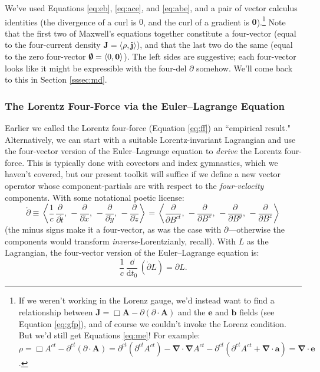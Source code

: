\documentclass[12pt]{article}
\renewcommand{\vv}[1]{\mathbf{#1}}
\newcommand{\dd}[1]{\mathrm{d}#1}
\newcommand{\del}{\boldsymbol{\nabla}}
\begin{document}
We've used Equations \ref{eq:eb}, \ref{eq:ace}, and \ref{eq:abe}, and a pair of vector calculus identities (the divergence of a curl is $0$, and the curl of a gradient is $\vv 0$).\footnote{If we weren't working in the Lorenz gauge, we'd instead want to find a relationship between $\vv J = \Box \vv A - \partialup (\partialup \cdot \vv A)$ and the $\vv e$ and $\vv b$ fields (see Equation \ref{eq:gfp}), and of course we couldn't invoke the Lorenz condition. But we'd still get Equations \ref{eq:me}! For example: $\rho = \Box A^{ct} - \partial^{ct}(\partialup \cdot \vv A) = \partial^{ct} (\partial^{ct} A^{ct}) - \del \cdot \del A^{ct} - \partial^{ct} (\partial^{ct} A^{ct} + \del \cdot \vv a) = \del \cdot \vv e$.} Note that the first two of Maxwell's equations together constitute a four-vector (equal to the four-current density $\vv J = \langle \rho, \vv j \rangle$), and that the last two do the same (equal to the zero four-vector $\textrm{\mbox{\boldmath $\emptyset$}} = \langle 0, \vv 0 \rangle$). The left sides are suggestive; each four-vector looks like it might be expressible with the four-del $\partialup$ somehow. We'll come back to this in Section \ref{sssec:md}.


\subsubsection{The Lorentz Four-Force via the Euler--Lagrange Equation}\label{sssec:ele}

Earlier we called the Lorentz four-force (Equation \ref{eq:ff}) an ``empirical result." Alternatively, we can start with a suitable Lorentz-invariant Lagrangian and use the four-vector version of the Euler--Lagrange equation to \emph{derive} the Lorentz four-force. This is typically done with covectors and index gymnastics, which we haven't covered, but our present toolkit will suffice if we define a new vector operator whose component-partials are with respect to the \emph{four-velocity} components. With some notational poetic license:
\begin{equation*}
\mathring{\partialup} \equiv \left \langle \dfrac{1}{c} \, \dfrac{\partial}{\partial \mathring{t}} , \,  - \dfrac{\partial}{\partial \mathring{x}} , \, - \dfrac{\partial}{\partial \mathring{y}} , \, - \dfrac{\partial}{\partial \mathring{z}} \right \rangle = \left \langle \dfrac{\partial}{\partial B^{ct}} , \,  - \dfrac{\partial}{\partial B^x} , \, - \dfrac{\partial}{\partial B^y} , \, - \dfrac{\partial}{\partial B^z} \right \rangle
\end{equation*}
(the minus signs make it a four-vector, as was the case with $\partialup$---otherwise the components would transform \emph{inverse}-Lorentzianly, recall). With $L$ as the Lagrangian, the four-vector version of the Euler--Lagrange equation is:
\begin{equation}\label{eq:ele}
\dfrac{1}{c} \, \dfrac{\dd}{\dd t_0} \, ( \mathring{\partialup} L ) = \partialup L .
\end{equation}
\end{document}
